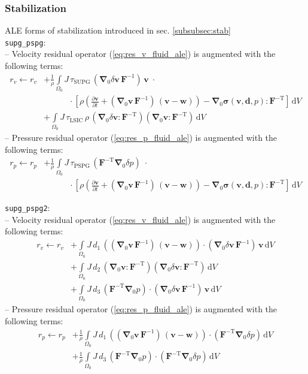 \documentclass[a4paper,12pt]{report}
\newcommand{\bs}[1]{\boldsymbol{#1}}
\newcommand{\Om}{\mathit{\Omega}}
\begin{document}
\subsubsection{Stabilization}
ALE forms of stabilization introduced in sec. \ref{subsubsec:stab}\\
\verb.supg_pspg.:\\
-- Velocity residual operator (\ref{eq:res_v_fluid_ale}) is augmented with the following terms:
\begin{align}
r_v \leftarrow r_v &+ \frac{1}{\rho}\int\limits_{\Om_0}J\, \tau_{\mathrm{SUPG}}\,(\bs{\nabla}_0\delta\bs{v}\,\bs{F}^{-1})\,\bs{v}\;\cdot \\
& \qquad\quad \cdot\left[\rho\left(\frac{\partial \bs{v}}{\partial t} + (\bs{\nabla}_0\bs{v}\,\bs{F}^{-1})\,(\bs{v}-\bs{w})\right) - \bs{\nabla}_{0} \bs{\sigma}(\bs{v},\bs{d},p) : \bs{F}^{-\mathrm{T}}\right]\,\mathrm{d}V \\
& + \int\limits_{\Om_0}J\, \tau_{\mathrm{LSIC}}\,\rho\,(\bs{\nabla}_{0}\delta\bs{v} : \bs{F}^{-\mathrm{T}})(\bs{\nabla}_{0}\bs{v} : \bs{F}^{-\mathrm{T}})\,\mathrm{d}V
\end{align}
-- Pressure residual operator (\ref{eq:res_p_fluid_ale}) is augmented with the following terms:
\begin{align}
r_p \leftarrow r_p &+ \frac{1}{\rho}\int\limits_{\Om_0}J\, \tau_{\mathrm{PSPG}}\,(\bs{F}^{-\mathrm{T}}\bs{\nabla}_{0}\delta p) \;\cdot \\
& \qquad\quad \cdot \left[\rho\left(\frac{\partial \bs{v}}{\partial t} + (\bs{\nabla}_0\bs{v}\,\bs{F}^{-1})\,(\bs{v}-\bs{w})\right) - \bs{\nabla}_{0} \bs{\sigma}(\bs{v},\bs{d},p) : \bs{F}^{-\mathrm{T}}\right]\,\mathrm{d}V
\end{align}

\verb.supg_pspg2.:\\
-- Velocity residual operator (\ref{eq:res_v_fluid_ale}) is augmented with the following terms:
\begin{align}
r_v \leftarrow r_v &+ \int\limits_{\Om_0} J\,d_1\,((\bs{\nabla}_{0}\bs{v}\,\bs{F}^{-1})\,(\bs{v}-\bs{w})) \cdot (\bs{\nabla}_{0}\delta\bs{v}\,\bs{F}^{-1})\,\bs{v}\,\mathrm{d}V \\
& + \int\limits_{\Om_0} J\,d_2\,(\bs{\nabla}_{0}\bs{v} : \bs{F}^{-\mathrm{T}}) (\bs{\nabla}_{0}\delta\bs{v} : \bs{F}^{-\mathrm{T}})\,\mathrm{d}V\\
&+ \int\limits_{\Om_0} J\,d_3\,(\bs{F}^{-\mathrm{T}}\bs{\nabla}_{0}p) \cdot (\bs{\nabla}_{0}\delta\bs{v}\,\bs{F}^{-1})\,\bs{v}\,\mathrm{d}V
\end{align}
-- Pressure residual operator (\ref{eq:res_p_fluid_ale}) is augmented with the following terms:
\begin{align}
r_p \leftarrow r_p &+ \frac{1}{\rho}\int\limits_{\Om_0} J\,d_1\,((\bs{\nabla}_{0}\bs{v}\,\bs{F}^{-1})\,(\bs{v}-\bs{w})) \cdot (\bs{F}^{-\mathrm{T}}\bs{\nabla}_{0}\delta p)\,\mathrm{d}V \\
&+ \frac{1}{\rho}\int\limits_{\Om_0} J\,d_3\,(\bs{F}^{-\mathrm{T}}\bs{\nabla}_{0}p) \cdot (\bs{F}^{-\mathrm{T}}\bs{\nabla}_{0}\delta p)\,\mathrm{d}V
\end{align}
\end{document}
